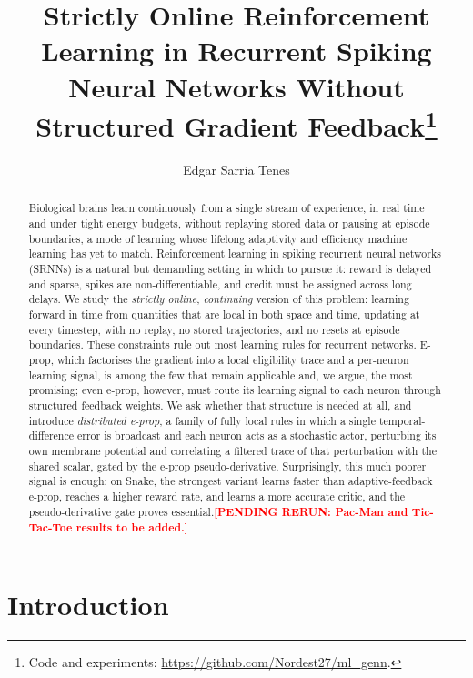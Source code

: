 \documentclass[10pt,twocolumn]{article}
\title{\sffamily\bfseries Strictly Online Reinforcement Learning in Recurrent Spiking
Neural Networks Without Structured Gradient Feedback\thanks{Code and experiments: \url{https://github.com/Nordest27/ml_genn}.}}
\author[1]{Edgar Sarria Tenes}
\affil[1]{Affiliation \\ \texttt{edgar.sarria@estudiantat.upc.edu}}
\date{}
\newcommand{\pending}[1]{\textcolor{red}{\bfseries[PENDING RERUN#1]}}
\begin{document}
\maketitle

\begin{abstract}
Biological brains learn continuously from a single stream of experience, in
real time and under tight energy budgets, without replaying stored data or
pausing at episode boundaries, a mode of learning whose lifelong adaptivity and
efficiency machine learning has yet to match. Reinforcement learning in spiking
recurrent neural networks (SRNNs) is a natural but demanding setting in which to
pursue it: reward is delayed and sparse, spikes are non-differentiable, and
credit must be assigned across long delays. We study the \emph{strictly online},
\emph{continuing} version of this problem: learning forward in time from
quantities that are local in both space and time, updating at every timestep,
with no replay, no stored trajectories, and no resets at episode boundaries.
These constraints rule out most learning rules for recurrent networks. E-prop,
which factorises the gradient into a local eligibility trace and a per-neuron
learning signal, is among the few that remain applicable and, we argue, the most
promising; even e-prop, however, must route its learning signal to each neuron
through structured feedback weights. We ask whether that structure is needed
at all, and introduce \emph{distributed e-prop}, a family of fully local rules
in which a single temporal-difference error is broadcast and each neuron acts
as a stochastic actor, perturbing its own membrane potential and correlating a
filtered trace of that perturbation with the shared scalar, gated by the e-prop
pseudo-derivative. Surprisingly, this much poorer signal is enough: on Snake,
the strongest variant learns faster than adaptive-feedback e-prop, reaches a
higher reward rate, and learns a more accurate critic, and the pseudo-derivative
gate proves essential.\pending{: Pac-Man and Tic-Tac-Toe results to be added.}
\end{abstract}

\section{Introduction}
\label{sec:intro}
\end{document}
